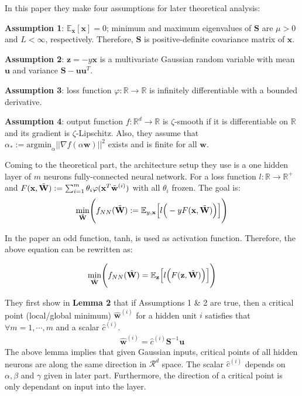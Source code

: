 \documentclass{article}
\begin{document}
In this paper they make four assumptions for later theoretical analysis:

\textbf{Assumption 1}: $\mathbb{E}_{\textbf{x}}[\textbf{x}]=0$; minimum and maximum eigenvalues of $\textbf{S}$ are $\mu>0$ and $L<\infty$, respectively. Therefore, $\textbf{S}$ is positive-definite covariance matrix of $\textbf{x}$.

\textbf{Assumption 2}: $\textbf{z}=-y\textbf{x}$ is a multivariate Gaussian random variable with mean $\textbf{u}$ and variance $\textbf{S}-\textbf{uu}^T$.

\textbf{Assumption 3}: loss function $\varphi:\mathbb{R}\rightarrow{}\mathbb{R}$ is infinitely differentiable with a bounded derivative.

\textbf{Assumption 4}: output function $f:\mathbb{R}^d\rightarrow{}\mathbb{R}$ is $\zeta$-smooth if it is differentiable on $\mathbb{R}$ and its gradient is $\zeta$-Lipschitz. Also, they assume that $\alpha_*:=\mathrm{argmin}_{\alpha}||\nabla f(\alpha\textbf{w})||^2$ exists and is finite for all $\textbf{w}$.

Coming to the theoretical part, the architecture setup they use is a one hidden layer of $m$ neurons fully-connected neural network. For a loss function $l:\mathbb{R}\rightarrow{}\mathbb{R}^+$ and $F(\textbf{x},\Tilde{\textbf{W}}):=\sum_{i=1}^m\theta_i\varphi(\textbf{x}^T\Tilde{\textbf{w}}^{(i)})$ with all $\theta_i$ frozen. The goal is:\\

\begin{align*}
\underset{\Tilde{\textbf{W}}}{\min}\Bigg(f_{NN}(\Tilde{\textbf{W}}):=\mathbb{E}_{y,\textbf{x}}\Big[l\Big(-yF(\textbf{x},\Tilde{\textbf{W}})\Big)\Big]\Bigg)
\end{align*}

In the paper an odd function, tanh, is used as activation function. Therefore, the above equation can be rewritten as:

\begin{align*}
\underset{\Tilde{\textbf{W}}}{\min}\Bigg(f_{NN}(\Tilde{\textbf{W}})=\mathbb{E}_{\textbf{z}}\Big[l\Big(F(\textbf{z},\Tilde{\textbf{W}})\Big)\Big]\Bigg)
\end{align*}

They first show in \textbf{Lemma 2} that if Assumptions 1 \& 2 are true, then a critical point (local/global minimum) $\hat{\textbf{w}}^{(i)}$ for a hidden unit $i$ satisfies that $\forall m=1,\cdots,m$ and a scalar $\hat{c}^{(i)}$.
\begin{align*}
\hat{\textbf{w}}^{(i)}=\hat{c}^{(i)}\textbf{S}^{-1}\textbf{u}
\end{align*}
The above lemma implies that given Gaussian inputs, critical points of all hidden neurons are along the same direction in $\mathcal{R}^d$ space. The scalar $\hat{c}^{(i)}$ depends on $\alpha, \beta$ and $\gamma$ given in later part. Furthermore, the direction of a critical point is only dependant on input into the layer. 
\end{document}
